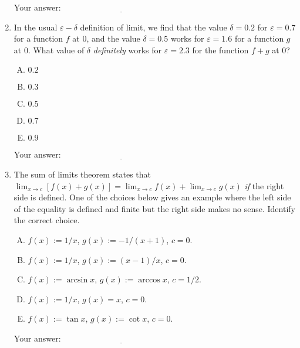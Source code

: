 \documentclass[10pt]{amsart}
\begin{document}
\begin{enumerate}
  \vspace{0.1in}
  Your answer: $\underline{\qquad\qquad\qquad\qquad\qquad\qquad\qquad}$
  \vspace{0.1in}

\item In the usual $\varepsilon-\delta$ definition of limit, we find that
  the value $\delta = 0.2$ for $\varepsilon = 0.7$ for a function $f$ at
  $0$, and the value $\delta = 0.5$ works for $\varepsilon = 1.6$ for a
  function $g$ at $0$. What value of $\delta$ {\em definitely} works
  for $\varepsilon = 2.3$ for the function $f + g$ at $0$?

  \begin{enumerate}[(A)]
  \item $0.2$
  \item $0.3$
  \item $0.5$
  \item $0.7$
  \item $0.9$
  \end{enumerate}

  \vspace{0.1in}
  Your answer: $\underline{\qquad\qquad\qquad\qquad\qquad\qquad\qquad}$
  \vspace{0.1in}

\item The sum of limits theorem states that $\displaystyle \lim_{x \to c} [f(x) +
  g(x)] = \displaystyle \lim_{x \to c} f(x) + \displaystyle \lim_{x \to c} g(x)$ {\em if} the
  right side is defined. One of the choices below gives an example
  where the left side of the equality is defined and finite but the right side
  makes no sense. Identify the correct choice.

  \begin{enumerate}[(A)]
  \item $f(x) := 1/x$, $g(x) := -1/(x + 1)$, $c = 0$.
  \item $f(x) := 1/x$, $g(x) := (x - 1)/x$, $c = 0$.
  \item $f(x) := \arcsin x$, $g(x) := \arccos x$, $c = 1/2$.
  \item $f(x) := 1/x$, $g(x) = x$, $c = 0$.
  \item $f(x) := \tan x$, $g(x) := \cot x$, $c = 0$.
  \end{enumerate}

  \vspace{0.1in}
  Your answer: $\underline{\qquad\qquad\qquad\qquad\qquad\qquad\qquad}$
  \vspace{0.1in}

\end{enumerate}
\end{document}
